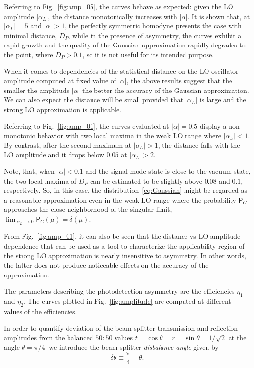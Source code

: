 \documentclass[%
reprint,
superscriptaddress,
 amsmath,amssymb,amsfonts,
 aps,
 pra,
 longbibliography
]{revtex4-2}
\newcommand{\prob}{\mathsf{P}}
\begin{document}
Referring to Fig.~\ref{fig:amp_05},
the curves behave as expected:
given the LO amplitude $|\alpha_L|$,
the distance monotonically increases with $|\alpha|$.
It is shown that,
at $|\alpha_L|=5$ and $|\alpha|>1$,
the perfectly symmetric homodyne presents the case
with minimal distance, $D_P$, while in the presence of asymmetry,
the curves exhibit a rapid growth and
the quality of  the Gaussian approximation
rapidly degrades to the point, where $D_P>0.1$,
so it is not useful for its intended purpose.

When it comes to dependencies of the statistical distance on
the LO oscillator amplitude
computed at fixed value of $|\alpha|$,
the above results suggest that the smaller the amplitude $|\alpha|$
the better the accuracy of the Gaussian approximation.
We can also expect the distance
will be small provided that $|\alpha_L|$ is large
and the strong LO approximation is applicable. 


Referring to Fig.~\ref{fig:amp_01},
the curves evaluated at $|\alpha|=0.5$
display a non-monotonic behavior with two local maxima
in the weak LO range where $|\alpha_L|<1$.
By contrast, after the second maximum at $|\alpha_L|>1$,
the distance falls with the LO amplitude
and it drops below $0.05$ at $|\alpha_L|>2$.

Note, that, when $|\alpha|<0.1$
and the signal mode state is close to the vacuum state,
the two local maxima of $D_P$ can be estimated to be slightly above $0.08$ and $0.1$,
respectively. So, in this case, the distribution~\eqref{eq:Gaussian}
might be regarded as a reasonable approximation even in the
weak LO range where
the probability $\prob_G$ approaches the close neighborhood of
the singular limit,
$\lim_{|\alpha_L|\to 0}\prob_G(\mu)=\delta(\mu)$. 


From Fig.~\ref{fig:amp_01},
it can also be seen that
the distance vs LO amplitude dependence
that can be used as a tool to characterize
the applicability region of the strong LO approximation
is nearly insensitive to asymmetry.
In other words, the latter does not produce noticeable effects on
the accuracy of the approximation.


The parameters describing
the photodetection asymmetry are
the efficiencies $\eta_1$ and $\eta_2$.
The curves plotted in Fig.~\ref{fig:amplitude}
are computed at different values of the efficiencies.

In order to quantify deviation of the beam splitter
transmission and reflection amplitudes
from the balanced $50:50$ values
$t=\cos\theta=r=\sin\theta=1/\sqrt{2}$ at
the angle $\theta=\pi/4$,
we introduce the beam splitter \textit{disbalance angle} given by
\begin{equation}
  \label{eq:delta-theta}
        \delta\theta\equiv\frac{\pi}{4}-\theta.
      \end{equation}
\end{document}
